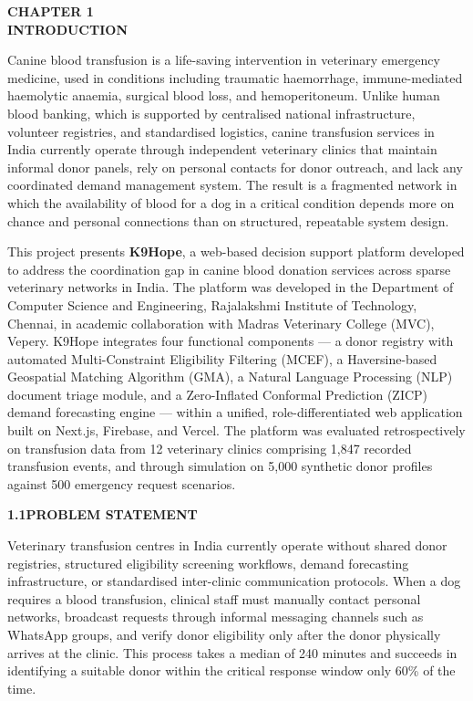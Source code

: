 \documentclass[12pt,a4paper]{article}
\begin{document}
\begin{center}
    \textbf{\large CHAPTER 1}\\[0.4em]
    \textbf{\large INTRODUCTION}
\end{center}
\vspace{1.5em}

\noindent Canine blood transfusion is a life-saving intervention in veterinary emergency medicine, used in conditions including traumatic haemorrhage, immune-mediated haemolytic anaemia, surgical blood loss, and hemoperitoneum. Unlike human blood banking, which is supported by centralised national infrastructure, volunteer registries, and standardised logistics, canine transfusion services in India currently operate through independent veterinary clinics that maintain informal donor panels, rely on personal contacts for donor outreach, and lack any coordinated demand management system. The result is a fragmented network in which the availability of blood for a dog in a critical condition depends more on chance and personal connections than on structured, repeatable system design.

\noindent This project presents \textbf{K9Hope}, a web-based decision support platform developed to address the coordination gap in canine blood donation services across sparse veterinary networks in India. The platform was developed in the Department of Computer Science and Engineering, Rajalakshmi Institute of Technology, Chennai, in academic collaboration with Madras Veterinary College (MVC), Vepery. K9Hope integrates four functional components — a donor registry with automated Multi-Constraint Eligibility Filtering (MCEF), a Haversine-based Geospatial Matching Algorithm (GMA), a Natural Language Processing (NLP) document triage module, and a Zero-Inflated Conformal Prediction (ZICP) demand forecasting engine — within a unified, role-differentiated web application built on Next.js, Firebase, and Vercel. The platform was evaluated retrospectively on transfusion data from 12 veterinary clinics comprising 1,847 recorded transfusion events, and through simulation on 5,000 synthetic donor profiles against 500 emergency request scenarios.

\vspace{1.5em}
\noindent\textbf{1.1\quad PROBLEM STATEMENT}
\vspace{0.6em}

\noindent Veterinary transfusion centres in India currently operate without shared donor registries, structured eligibility screening workflows, demand forecasting infrastructure, or standardised inter-clinic communication protocols. When a dog requires a blood transfusion, clinical staff must manually contact personal networks, broadcast requests through informal messaging channels such as WhatsApp groups, and verify donor eligibility only after the donor physically arrives at the clinic. This process takes a median of 240 minutes and succeeds in identifying a suitable donor within the critical response window only 60\% of the time.
\end{document}
